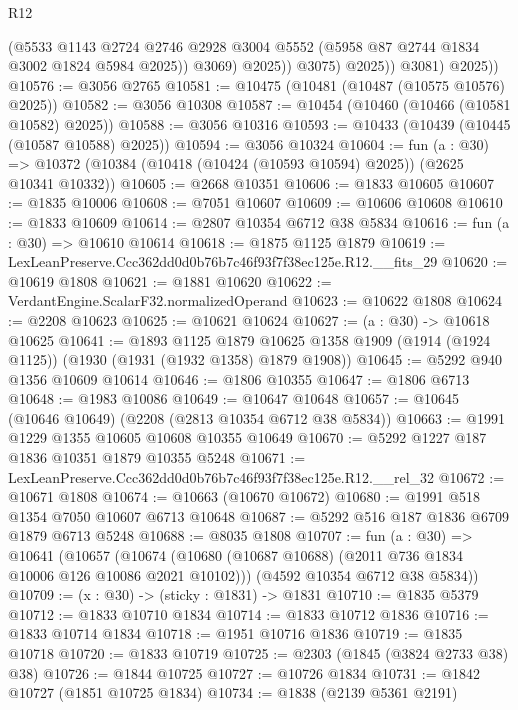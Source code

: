 \begin{lexlean}{R12}
\begin{coremodule}
                      (@5533
                        @1143
                        @2724
                        @2746
                        @2928
                        @3004
                        @5552
                        (@5958 @87 @2744 @1834 @3002 @1824 @5984 @2025))
                      @3069)
                    @2025))
                @3075)
              @2025))
          @3081)
        @2025))
@10576 := @3056 @2765
@10581 := @10475 (@10481 (@10487 (@10575 @10576) @2025))
@10582 := @3056 @10308
@10587 := @10454 (@10460 (@10466 (@10581 @10582) @2025))
@10588 := @3056 @10316
@10593 := @10433 (@10439 (@10445 (@10587 @10588) @2025))
@10594 := @3056 @10324
@10604 := fun (a : @30) =>
  @10372 (@10384 (@10418 (@10424 (@10593 @10594) @2025)) (@2625 @10341 @10332))
@10605 := @2668 @10351
@10606 := @1833 @10605
@10607 := @1835 @10006
@10608 := @7051 @10607
@10609 := @10606 @10608
@10610 := @1833 @10609
@10614 := @2807 @10354 @6712 @38 @5834
@10616 := fun (a : @30) => @10610 @10614
@10618 := @1875 @1125 @1879
@10619 := LexLeanPreserve.Ccc362dd0d0b76b7c46f93f7f38ec125e.R12.__fits_29
@10620 := @10619 @1808
@10621 := @1881 @10620
@10622 := VerdantEngine.ScalarF32.normalizedOperand
@10623 := @10622 @1808
@10624 := @2208 @10623
@10625 := @10621 @10624
@10627 := (a : @30) -> @10618 @10625
@10641 := @1893
    @1125
    @1879
    @10625
    @1358
    @1909
    (@1914 (@1924 @1125))
    (@1930 (@1931 (@1932 @1358) @1879 @1908))
@10645 := @5292 @940 @1356 @10609 @10614
@10646 := @1806 @10355
@10647 := @1806 @6713
@10648 := @1983 @10086
@10649 := @10647 @10648
@10657 := @10645 (@10646 @10649) (@2208 (@2813 @10354 @6712 @38 @5834))
@10663 := @1991 @1229 @1355 @10605 @10608 @10355 @10649
@10670 := @5292 @1227 @187 @1836 @10351 @1879 @10355 @5248
@10671 := LexLeanPreserve.Ccc362dd0d0b76b7c46f93f7f38ec125e.R12.__rel_32
@10672 := @10671 @1808
@10674 := @10663 (@10670 @10672)
@10680 := @1991 @518 @1354 @7050 @10607 @6713 @10648
@10687 := @5292 @516 @187 @1836 @6709 @1879 @6713 @5248
@10688 := @8035 @1808
@10707 := fun (a : @30) =>
  @10641
    (@10657
      (@10674 (@10680 (@10687 @10688) (@2011 @736 @1834 @10006 @126 @10086 @2021 @10102)))
      (@4592 @10354 @6712 @38 @5834))
@10709 := (x : @30) -> (sticky : @1831) -> @1831
@10710 := @1835 @5379
@10712 := @1833 @10710 @1834
@10714 := @1833 @10712 @1836
@10716 := @1833 @10714 @1834
@10718 := @1951 @10716 @1836
@10719 := @1835 @10718
@10720 := @1833 @10719
@10725 := @2303 (@1845 (@3824 @2733 @38) @38)
@10726 := @1844 @10725
@10727 := @10726 @1834
@10731 := @1842 @10727 (@1851 @10725 @1834)
@10734 := @1838 (@2139 @5361 @2191)

\end{coremodule}
\end{lexlean}
